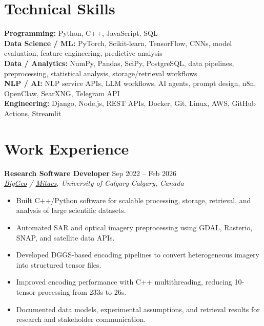 \documentclass[a4paper,10pt]{article}
\newcommand{\resumeSubheading}[4]{
    \textbf{#1} \hfill #2 \\
    \textit{#3} \hfill \textit{#4}
}
\begin{document}
\section*{Technical Skills}

\textbf{Programming:} Python, C++, JavaScript, SQL \\
\textbf{Data Science / ML:} PyTorch, Scikit-learn, TensorFlow, CNNs, model evaluation, feature engineering, predictive analysis \\
\textbf{Data / Analytics:} NumPy, Pandas, SciPy, PostgreSQL, data pipelines, preprocessing, statistical analysis, storage/retrieval workflows \\
\textbf{NLP / AI:} NLP service APIs, LLM workflows, AI agents, prompt design, n8n, OpenClaw, SearXNG, Telegram API \\
\textbf{Engineering:} Django, Node.js, REST APIs, Docker, Git, Linux, AWS, GitHub Actions, Streamlit


\section*{Work Experience}

\resumeSubheading
{Research Software Developer}
{Sep 2022 -- Feb 2026}
{\href{https://biggeo.com}{BigGeo} / \href{https://www.mitacs.ca/}{Mitacs}, University of Calgary}
{Calgary, Canada}
\begin{itemize}[leftmargin=0.25in]
    \item Built C++/Python software for scalable processing, storage, retrieval, and analysis of large scientific datasets.
    \item Automated SAR and optical imagery preprocessing using GDAL, Rasterio, SNAP, and satellite data APIs.
    \item Developed DGGS-based encoding pipelines to convert heterogeneous imagery into structured tensor files.
    \item Improved encoding performance with C++ multithreading, reducing 10-tensor processing from 233s to 26s.
    \item Documented data models, experimental assumptions, and retrieval results for research and stakeholder communication.
\end{itemize}
\end{document}
